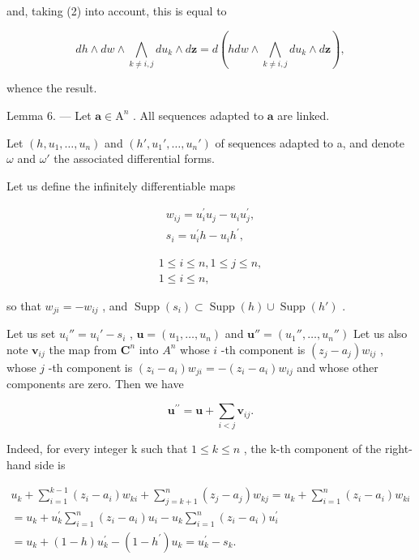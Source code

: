 and, taking (2) into account, this is equal to

\[
d h \wedge d w \wedge \bigwedge_ {k \neq i, j} d u _ {k} \wedge d \boldsymbol {z} = d \left(h d w \wedge \bigwedge_ {k \neq i, j} d u _ {k} \wedge d \boldsymbol {z}\right),
\]

whence the result.

Lemma 6. — Let \(\mathbf{a} \in \mathrm{A}^n\) . All sequences adapted to \(\mathbf{a}\) are linked.

Let \((h,u_{1},\ldots,u_{n})\) and \((h',u_{1}',\ldots,u_{n}')\) of sequences adapted to a, and denote \(\omega\) and \(\omega'\) the associated differential forms.

Let us define the infinitely differentiable maps

\[
\begin{array}{c} {w _ {i j} = u _ {i} ^ {\prime} u _ {j} - u _ {i} u _ {j} ^ {\prime},} \\ {s _ {i} = u _ {i} ^ {\prime} h - u _ {i} h ^ {\prime},} \end{array}
\]

\[
\begin{array}{l} 1 \leqslant i \leqslant n, 1 \leqslant j \leqslant n, \\ 1 \leqslant i \leqslant n, \end{array}
\]

so that \(w_{ji} = -w_{ij}\) , and \(\operatorname{Supp}(s_i) \subset \operatorname{Supp}(h) \cup \operatorname{Supp}(h')\) .

Let us set \(u_i'' = u_i' - s_i\) , \(\boldsymbol{u} = (u_1, \ldots, u_n)\) and \(\boldsymbol{u}'' = (u_1'', \ldots, u_n'')\) Let us also note \(\boldsymbol{v}_{ij}\) the map from \(\mathbf{C}^n\) into \(A^n\) whose \(i\) -th component is \((z_j - a_j) w_{ij}\) , whose \(j\) -th component is \((z_i - a_i) w_{ji} = -(z_i - a_i) w_{ij}\) and whose other components are zero. Then we have

\[
\boldsymbol {u} ^ {\prime \prime} = \boldsymbol {u} + \sum_ {i <   j} \boldsymbol {v} _ {i j}.
\]

Indeed, for every integer k such that \(1 \leqslant k \leqslant n\) , the k-th component of the right-hand side is

\[
\begin{array}{c} u _ {k} + \sum_ {i = 1} ^ {k - 1} (z _ {i} - a _ {i}) w _ {k i} + \sum_ {j = k + 1} ^ {n} (z _ {j} - a _ {j}) w _ {k j} = u _ {k} + \sum_ {i = 1} ^ {n} (z _ {i} - a _ {i}) w _ {k i} \\ = u _ {k} + u _ {k} ^ {\prime} \sum_ {i = 1} ^ {n} (z _ {i} - a _ {i}) u _ {i} - u _ {k} \sum_ {i = 1} ^ {n} (z _ {i} - a _ {i}) u _ {i} ^ {\prime} \\ = u _ {k} + (1 - h) u _ {k} ^ {\prime} - (1 - h ^ {\prime}) u _ {k} = u _ {k} ^ {\prime} - s _ {k}. \end{array}
\]

